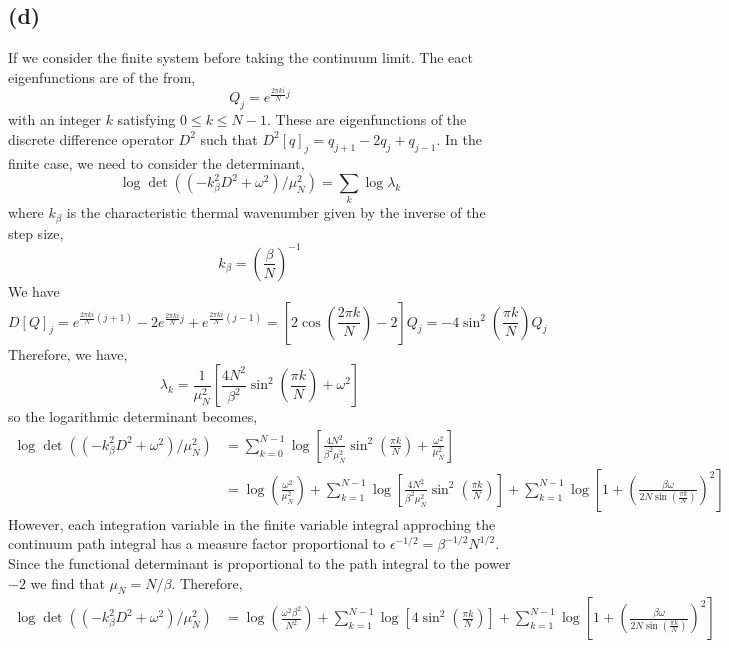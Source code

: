 \documentclass[12pt]{article}
\begin{document}
\subsection{(d)}

If we consider the finite system before taking the continuum limit. The eact eigenfunctions are of the from,
\[ Q_j = e^{\frac{2 \pi k i}{N} j}  \]
with an integer $k$ satisfying $0 \le k \le N - 1$. These are eigenfunctions of the discrete difference operator $D^2$ such that $D^2[q]_j = q_{j+1} - 2 q_{j} + q_{j-1}$. In the finite case, we need to consider the determinant,
\[ \log{\det{((-k_{\beta}^2 D^2 + \omega^2)/\mu_N^2)}} = \sum_k \log{\lambda_k} \]
where $k_\beta$ is the characteristic thermal wavenumber given by the inverse of the step size,
\[ k_\beta = \left( \frac{\beta}{N} \right)^{-1} \] 
We have
\[ D[Q]_j = e^{\frac{2 \pi k i}{N} (j + 1)} - 2 e^{\frac{2 \pi k i}{N} j} + e^{\frac{2 \pi k i}{N} (j-1)} = \left[ 2 \cos{\left( \frac{2 \pi k}{N} \right)} - 2 \right] Q_j = -4 \sin^2{\left( \frac{\pi k}{N} \right)} Q_j \]
Therefore, we have,
\[ \lambda_k = \frac{1}{\mu_N^2} \left[ \frac{4 N^2}{\beta^2} \sin^2{\left( \frac{\pi k}{N} \right)}  + \omega^2 \right] \]
so the logarithmic determinant becomes,
\begin{align*}
\log{\det{((-k_{\beta}^2 D^2 + \omega^2)/\mu_N^2)}} & = \sum_{k = 0}^{N-1} \log{\left[ \frac{4 N^2}{\beta^2 \mu_N^2} \sin^2{\left( \frac{\pi k}{N} \right)}  + \frac{\omega^2}{\mu_N^2} \right] } 
\\
& = \log{\left( \frac{\omega^2}{\mu_N^2} \right)} + \sum_{k = 1}^{N - 1} \log{\left[ \frac{4 N^2}{\beta^2 \mu_N^2} \sin^2{\left( \frac{\pi k}{N} \right)} \right]} + \sum_{k = 1}^{N-1} \log{\left[ 1 + \left( \frac{\beta \omega}{2 N \sin{\left( \frac{\pi k}{N} \right)}} \right)^2 \right]}
\end{align*}
However, each integration variable in the finite variable integral approching the continuum path integral has a measure factor proportional to $\epsilon^{-1/2} = \beta^{-1/2} N^{1/2}$. Since the functional determinant is proportional to the path integral to the power $-2$ we find that $\mu_N =  N / \beta$. Therefore,
\begin{align*}
\log{\det{((-k_{\beta}^2 D^2 + \omega^2)/\mu_N^2)}} & = \log{\left( \frac{\omega^2 \beta^2}{N^2} \right)} + \sum_{k = 1}^{N - 1} \log{\left[ 4 \sin^2{\left( \frac{\pi k}{N} \right)} \right]} + \sum_{k = 1}^{N-1} \log{\left[ 1 + \left( \frac{\beta \omega}{2 N \sin{\left( \frac{\pi k}{N} \right)}} \right)^2 \right]}
\end{align*}
\end{document}
